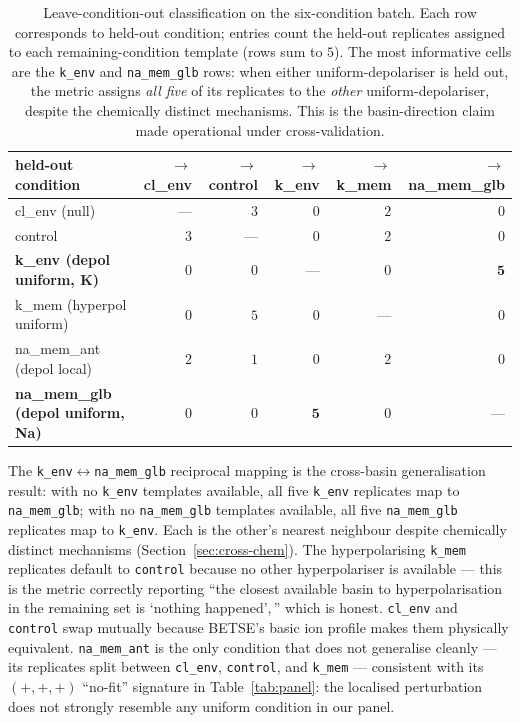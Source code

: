 \documentclass[11pt,a4paper]{article}
\begin{document}
\begin{table}[h]\centering\scriptsize
\caption{Leave-condition-out classification on the six-condition batch. Each row corresponds to held-out condition; entries count the held-out replicates assigned to each remaining-condition template (rows sum to $5$). The most informative cells are the \texttt{k\_env} and \texttt{na\_mem\_glb} rows: when either uniform-depolariser is held out, the metric assigns \emph{all five} of its replicates to the \emph{other} uniform-depolariser, despite the chemically distinct mechanisms. This is the basin-direction claim made operational under cross-validation.}\label{tab:lco}
\begin{tabular}{lrrrrr}\toprule
held-out condition  & $\to$ cl\_env & $\to$ control & $\to$ k\_env & $\to$ k\_mem & $\to$ na\_mem\_glb \\
\midrule
cl\_env (null)              & --- & $3$ & $0$ & $2$ & $0$ \\
control                     & $3$ & --- & $0$ & $2$ & $0$ \\
\textbf{k\_env (depol uniform, K)}        & $0$ & $0$ & --- & $0$ & $\mathbf{5}$ \\
k\_mem (hyperpol uniform)   & $0$ & $5$ & $0$ & --- & $0$ \\
na\_mem\_ant (depol local)  & $2$ & $1$ & $0$ & $2$ & $0$ \\
\textbf{na\_mem\_glb (depol uniform, Na)} & $0$ & $0$ & $\mathbf{5}$ & $0$ & --- \\
\bottomrule\end{tabular}
\end{table}

The \texttt{k\_env}$\leftrightarrow$\texttt{na\_mem\_glb} reciprocal mapping is the cross-basin generalisation result: with no \texttt{k\_env} templates available, all five \texttt{k\_env} replicates map to \texttt{na\_mem\_glb}; with no \texttt{na\_mem\_glb} templates available, all five \texttt{na\_mem\_glb} replicates map to \texttt{k\_env}. Each is the other's nearest neighbour despite chemically distinct mechanisms (Section~\ref{sec:cross-chem}). The hyperpolarising \texttt{k\_mem} replicates default to \texttt{control} because no other hyperpolariser is available --- this is the metric correctly reporting ``the closest available basin to hyperpolarisation in the remaining set is `nothing happened',\,'' which is honest. \texttt{cl\_env} and \texttt{control} swap mutually because BETSE's basic ion profile makes them physically equivalent. \texttt{na\_mem\_ant} is the only condition that does not generalise cleanly --- its replicates split between \texttt{cl\_env}, \texttt{control}, and \texttt{k\_mem} --- consistent with its $(+,+,+)$ ``no-fit'' signature in Table~\ref{tab:panel}: the localised perturbation does not strongly resemble any uniform condition in our panel.
\end{document}
